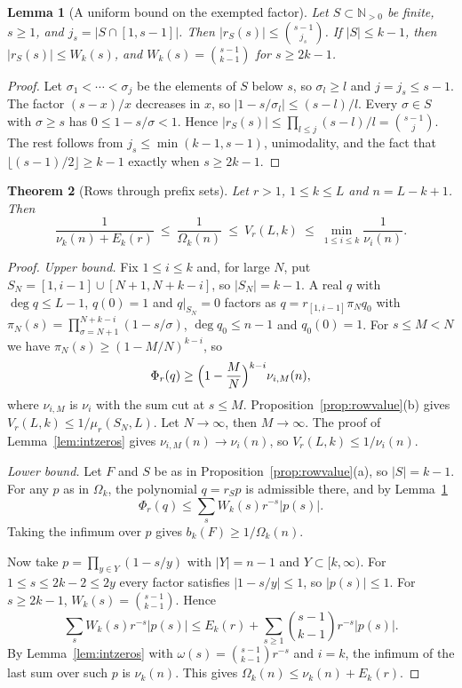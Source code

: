 \documentclass[11pt]{article}
\newtheorem{theorem}{Theorem}[section]
\newtheorem{lemma}[theorem]{Lemma}
\newcommand{\N}{\mathbb N}
\begin{document}
\begin{lemma}[A uniform bound on the exempted factor]\label{lem:rowpointwise}
Let $S\subset\N_{>0}$ be finite, $s\ge1$, and $j_s=|S\cap[1,s-1]|$.  Then
$|r_S(s)|\le\binom{s-1}{j_s}$.  If $|S|\le k-1$, then
$|r_S(s)|\le W_k(s)$, and $W_k(s)=\binom{s-1}{k-1}$ for $s\ge2k-1$.
\end{lemma}

\begin{proof}
Let $\sigma_1<\cdots<\sigma_{j}$ be the elements of $S$ below $s$, so
$\sigma_l\ge l$ and $j=j_s\le s-1$.  The factor $(s-x)/x$ decreases in $x$, so
$|1-s/\sigma_l|\le(s-l)/l$.  Every $\sigma\in S$ with $\sigma\ge s$ has
$0\le1-s/\sigma<1$.  Hence
$|r_S(s)|\le\prod_{l\le j}(s-l)/l=\binom{s-1}j$.  The rest follows from
$j_s\le\min(k-1,s-1)$, unimodality, and the fact that
$\lfloor(s-1)/2\rfloor\ge k-1$ exactly when $s\ge2k-1$.
\end{proof}

\begin{theorem}[Rows through prefix sets]\label{thm:prefixrows}
Let $r>1$, $1\le k\le L$ and $n=L-k+1$.  Then
\begin{equation}\label{eq:prefixsandwich}
  \frac1{\nu_k(n)+E_k(r)}\ \le\ \frac1{\Omega_k(n)}\ \le\ V_r(L,k)\ \le\
  \min_{1\le i\le k}\frac1{\nu_i(n)} .
\end{equation}
\end{theorem}

\begin{proof}
\emph{Upper bound.}  Fix $1\le i\le k$ and, for large $N$, put
$S_N=[1,i-1]\cup[N+1,N+k-i]$, so $|S_N|=k-1$.  A real $q$ with
$\deg q\le L-1$, $q(0)=1$ and $q|_{S_N}=0$ factors as
$q=r_{[1,i-1]}\pi_Nq_0$ with $\pi_N(s)=\prod_{\sigma=N+1}^{N+k-i}(1-s/\sigma)$,
$\deg q_0\le n-1$ and $q_0(0)=1$.  For $s\le M<N$ we have
$\pi_N(s)\ge(1-M/N)^{k-i}$, so
\[
  \Phi_r(q)\ge\Bigl(1-\frac MN\Bigr)^{k-i}\nu_{i,M}(n),
\]
where $\nu_{i,M}$ is $\nu_i$ with the sum cut at $s\le M$.
Proposition~\ref{prop:rowvalue}(b) gives
$V_r(L,k)\le1/\mu_r(S_N,L)$.  Let $N\to\infty$, then $M\to\infty$.  The
proof of Lemma~\ref{lem:intzeros} gives $\nu_{i,M}(n)\to\nu_i(n)$, so
$V_r(L,k)\le1/\nu_i(n)$.

\emph{Lower bound.}  Let $F$ and $S$ be as in
Proposition~\ref{prop:rowvalue}(a), so $|S|=k-1$.  For any $p$ as in
$\Omega_k$, the polynomial $q=r_Sp$ is admissible there, and by
Lemma~\ref{lem:rowpointwise}
\[
  \Phi_r(q)\le\sum_sW_k(s)r^{-s}|p(s)| .
\]
Taking the infimum over $p$ gives $b_k(F)\ge1/\Omega_k(n)$.

Now take $p=\prod_{y\in Y}(1-s/y)$ with $|Y|=n-1$ and $Y\subset[k,\infty)$.
For $1\le s\le2k-2\le2y$ every factor satisfies $|1-s/y|\le1$, so
$|p(s)|\le1$.  For $s\ge2k-1$, $W_k(s)=\binom{s-1}{k-1}$.  Hence
\[
  \sum_sW_k(s)r^{-s}|p(s)|\le E_k(r)+\sum_{s\ge1}\binom{s-1}{k-1}r^{-s}|p(s)| .
\]
By Lemma~\ref{lem:intzeros} with $\omega(s)=\binom{s-1}{k-1}r^{-s}$ and
$i=k$, the infimum of the last sum over such $p$ is $\nu_k(n)$.  This gives
$\Omega_k(n)\le\nu_k(n)+E_k(r)$.
\end{proof}
\end{document}
